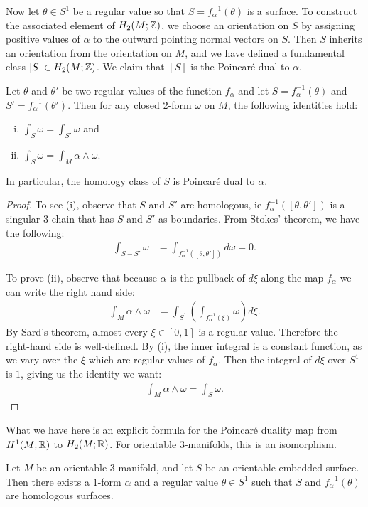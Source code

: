 Now let $\theta \in S^1$ be a regular value so that $S = f^{-1}_{\alpha}(\theta)$ is a surface.
To construct the associated element of $H_2(M;\mathbb{Z})$, we choose an orientation on $S$ by assigning positive values of $\alpha$ to the outward pointing normal vectors on $S$.
Then $S$ inherits an orientation from the orientation on $M$, and we have defined a
fundamental class $[S]\in H_2(M;\mathbb{Z})$.
We claim that $[S]$ is the Poincar\'e dual to $\alpha$.
\begin{lem}
  \label{lem:poincare-duality}
  Let $\theta$ and $\theta'$ be two regular values of the function $f_{\alpha}$ and let $S=f_\alpha^{-1}(\theta)$ and $S'=f_\alpha^{-1}(\theta')$.
  Then for any closed $2$-form $\omega$ on $M$, the following identities hold:
  \begin{enumerate}[(i)]
  \item $\displaystyle
    \int_{S} \omega = \displaystyle\int_{S'} \omega$ and
 \item $\displaystyle
    \int_S \omega = \displaystyle\int_M \alpha \wedge \omega.$
  \end{enumerate}
  In particular, the homology class of $S$ is Poincar\'e dual to $\alpha$.
\end{lem}
\begin{proof}
  To see (i), observe that $S$ and $S'$ are homologous, ie $f^{-1}_{\alpha}([\theta, \theta'])$ is a singular $3$-chain that has $S$ and $S'$ as boundaries.
  From Stokes' theorem, we have the following:
  \begin{align*}
    \int_{S - S'} \omega &= \int_{f_{\alpha}^{-1}([\theta, \theta'])} d\omega
                         = 0.
  \end{align*}

  To prove (ii), observe that because $\alpha$ is the pullback of $d\xi$ along the map $f_{\alpha}$ we can write the right hand side:
  \begin{align*}
    \int_M \alpha \wedge \omega &= \int_{S^1} \left(   \int_{f_{\alpha}^{-1}(\xi)} \omega \right) d\xi.
  \end{align*}
  By Sard's theorem, almost every $\xi \in [0,1]$ is a regular value.  Therefore the right-hand side is well-defined.
  By (i), the inner integral is a constant function, as we vary over the $\xi$ which are regular values of $f_{\alpha}$.
  Then the integral of $d\xi$ over $S^1$ is $1$, giving us the identity we want:
  \begin{align*}
    \int_M \alpha \wedge \omega = \int_S \omega.
  \end{align*}
\end{proof}
What we have here is an explicit formula for the Poincar\'e duality map from $H^1(M; \mathbb{R})$ to $H_2(M; \mathbb{R})$.
For orientable $3$-manifolds, this is an isomorphism.%
\begin{thm}
  \label{thm:orientable-poincare-duality}
  Let $M$ be an orientable $3$-manifold, and let $S$ be an orientable embedded surface. Then there exists a $1$-form
  $\alpha$ and a regular value $\theta \in S^1$ such that $S$ and $f_{\alpha}^{-1}(\theta)$ are homologous surfaces.
\end{thm}

